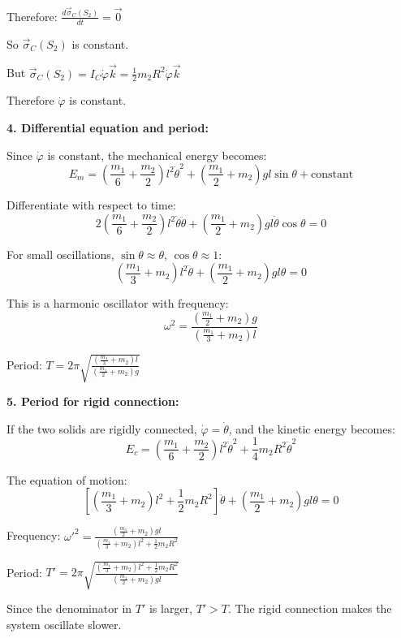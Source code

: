 \documentclass[12pt]{article}
\begin{document}
\begin{correctionbox}
Therefore: $\frac{d\vec{\sigma}_C(S_2)}{dt} = \vec{0}$

So $\vec{\sigma}_C(S_2)$ is constant.

But $\vec{\sigma}_C(S_2) = I_C\dot{\varphi}\vec{k} = \frac{1}{2}m_2R^2\dot{\varphi}\vec{k}$

Therefore $\dot{\varphi}$ is constant.

\textbf{4. Differential equation and period:}

Since $\dot{\varphi}$ is constant, the mechanical energy becomes:
$$E_m = \left(\frac{m_1}{6} + \frac{m_2}{2}\right)l^2\dot{\theta}^2 + \left(\frac{m_1}{2} + m_2\right)gl\sin\theta + \text{constant}$$

Differentiate with respect to time:
$$2\left(\frac{m_1}{6} + \frac{m_2}{2}\right)l^2\dot{\theta}\ddot{\theta} + \left(\frac{m_1}{2} + m_2\right)gl\dot{\theta}\cos\theta = 0$$

For small oscillations, $\sin\theta \approx \theta$, $\cos\theta \approx 1$:
$$\left(\frac{m_1}{3} + m_2\right)l^2\ddot{\theta} + \left(\frac{m_1}{2} + m_2\right)gl\theta = 0$$

This is a harmonic oscillator with frequency:
$$\omega^2 = \frac{\left(\frac{m_1}{2} + m_2\right)g}{\left(\frac{m_1}{3} + m_2\right)l}$$

Period: $T = 2\pi\sqrt{\frac{\left(\frac{m_1}{3} + m_2\right)l}{\left(\frac{m_1}{2} + m_2\right)g}}$

\textbf{5. Period for rigid connection:}

If the two solids are rigidly connected, $\dot{\varphi} = \dot{\theta}$, and the kinetic energy becomes:
$$E_c = \left(\frac{m_1}{6} + \frac{m_2}{2}\right)l^2\dot{\theta}^2 + \frac{1}{4}m_2R^2\dot{\theta}^2$$

The equation of motion:
$$\left[\left(\frac{m_1}{3} + m_2\right)l^2 + \frac{1}{2}m_2R^2\right]\ddot{\theta} + \left(\frac{m_1}{2} + m_2\right)gl\theta = 0$$

Frequency: $\omega'^2 = \frac{\left(\frac{m_1}{2} + m_2\right)gl}{\left(\frac{m_1}{3} + m_2\right)l^2 + \frac{1}{2}m_2R^2}$

Period: $T' = 2\pi\sqrt{\frac{\left(\frac{m_1}{3} + m_2\right)l^2 + \frac{1}{2}m_2R^2}{\left(\frac{m_1}{2} + m_2\right)gl}}$

Since the denominator in $T'$ is larger, $T' > T$. The rigid connection makes the system oscillate slower.
\end{correctionbox}

\section{}
\end{document}
